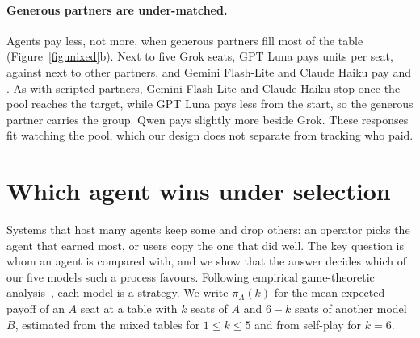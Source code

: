 \paragraph{Generous partners are under-matched.}
Agents pay less, not more, when generous partners fill most of the table
(Figure~\ref{fig:mixed}b). Next to five Grok seats, GPT Luna pays \MixLunaBesideFiveGrok{} units
per seat, against \MixLunaBesideOthers{} next to other partners, and Gemini Flash-Lite and
Claude Haiku pay \MixFlashBesideFiveGrok{} and \MixHaikuBesideFiveGrok{}. As with scripted
partners, Gemini Flash-Lite and Claude Haiku stop once the pool reaches the target, while GPT
Luna pays less from the start, so the generous partner carries the group. Qwen pays slightly
more beside Grok. These responses fit watching the pool, which our design does not separate
from tracking who paid.

\section{Which agent wins under selection}
\label{sec:selection}

Systems that host many agents keep some and drop others: an operator picks the agent that
earned most, or users copy the one that did well. The key question is whom an agent is
compared with, and we show that the answer decides which of our five models such a process
favours. Following empirical game-theoretic
analysis~\cite{wellman2006methods,tuyls2018generalised}, each model is a strategy. We write
$\pi_A(k)$ for the mean expected payoff of an $A$ seat at a table with $k$ seats of $A$ and
$6-k$ seats of another model $B$, estimated from the mixed tables for $1\le k\le5$ and from
self-play for $k=6$.

